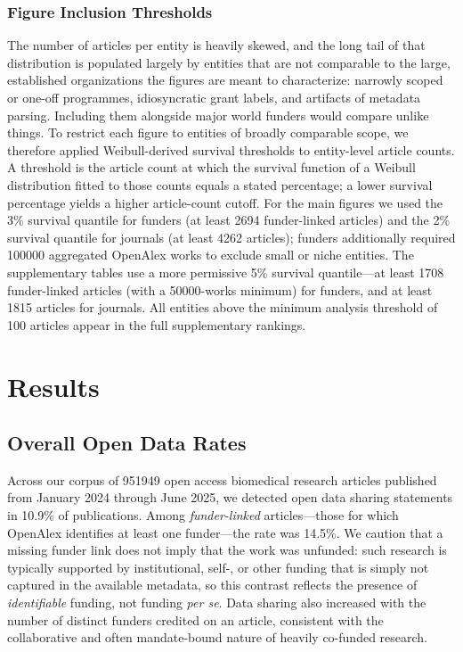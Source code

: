 \subsubsection{Figure Inclusion Thresholds}\label{sec:thresholds}

The number of articles per entity is heavily skewed, and the long tail of that distribution is populated largely by entities that are not comparable to the large, established organizations the figures are meant to characterize: narrowly scoped or one-off programmes, idiosyncratic grant labels, and artifacts of metadata parsing. Including them alongside major world funders would compare unlike things. To restrict each figure to entities of broadly comparable scope, we therefore applied Weibull-derived survival thresholds to entity-level article counts. A threshold is the article count at which the survival function of a Weibull distribution fitted to those counts equals a stated percentage; a lower survival percentage yields a higher article-count cutoff. For the main figures we used the 3\% survival quantile for funders (at least \num{2694} funder-linked articles) and the 2\% survival quantile for journals (at least \num{4262} articles); funders additionally required \num{100000} aggregated OpenAlex works to exclude small or niche entities. The supplementary tables use a more permissive 5\% survival quantile---at least \num{1708} funder-linked articles (with a \num{50000}-works minimum) for funders, and at least \num{1815} articles for journals. All entities above the minimum analysis threshold of 100 articles appear in the full supplementary rankings.


\section{Results}

\subsection{Overall Open Data Rates}

Across our corpus of \num{951949} open access biomedical research articles published from January 2024 through June 2025, we detected open data sharing statements in 10.9\% of publications. Among \emph{funder-linked} articles---those for which OpenAlex identifies at least one funder---the rate was 14.5\%. We caution that a missing funder link does not imply that the work was unfunded: such research is typically supported by institutional, self-, or other funding that is simply not captured in the available metadata, so this contrast reflects the presence of \emph{identifiable} funding, not funding \emph{per se}. Data sharing also increased with the number of distinct funders credited on an article, consistent with the collaborative and often mandate-bound nature of heavily co-funded research.

